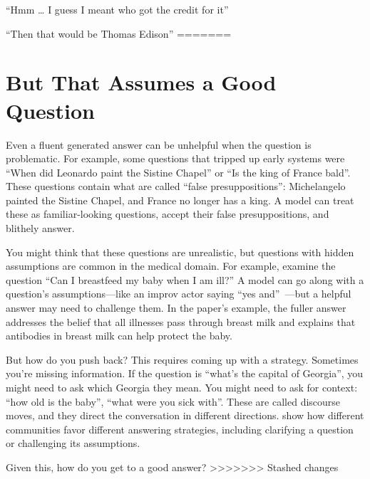 “Hmm … I guess I meant who got the credit for it”

“Then that would be Thomas Edison”
=======
\section{But That Assumes a Good Question}
\label{sec:methods:presuppositions}

Even a fluent generated answer can be unhelpful when the question is problematic.  For example, some questions that tripped up early  systems were ``When did Leonardo paint the Sistine Chapel'' or ``Is the king of France bald''.  These questions contain what are called ``false presuppositions'': Michelangelo painted the Sistine Chapel, and France no longer has a king.  A model can treat these as familiar-looking questions, accept their false presuppositions, and blithely answer.

You might think that these questions are unrealistic, but questions with hidden assumptions are common in the medical domain.
For example, \citet{srikanth-24-pregnant} examine the question ``Can I breastfeed my baby when I am ill?''  A model can go along with a question's assumptions---like an improv actor saying ``yes and''~\citep{cho-20-spolin}---but a helpful answer may need to challenge them.  In the paper's example, the fuller answer addresses the belief that all illnesses pass through breast milk and explains that antibodies in breast milk can help protect the baby.

But how do you push back?  This requires coming up with a strategy.  Sometimes you're missing information.  If the question is ``what's the capital of Georgia'', you might need to ask which Georgia they mean.  You might need to ask for context: ``how old is the baby'', ``what were you sick with''.  These are called discourse moves, and they direct the conversation in different directions.  \citet{srikanth-26-discotrace} show how different communities favor different answering strategies, including clarifying a question or challenging its assumptions.

Given this, how do you get to a good answer?
>>>>>>> Stashed changes
